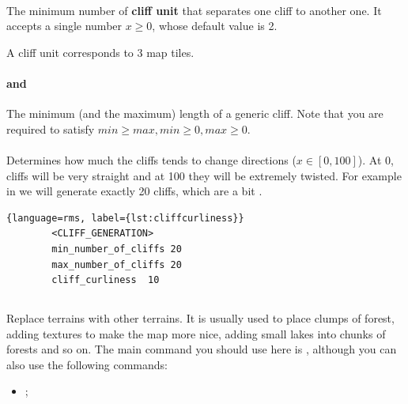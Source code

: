 \begin{appendices}
    \paragraph{}

    The minimum number of \textbf{cliff unit} that separates one cliff to another one. It accepts a single number $x \geq 0$, whose default value is 2.

    \begin{definition}
        A cliff unit corresponds to 3 map tiles.
    \end{definition}

    \paragraph{ and }

    The minimum (and the maximum) length of a generic cliff. Note that you are required to satisfy $min \geq max, min \geq 0, max \geq 0$.

    \paragraph{}

    Determines how much the cliffs tends to change directions ($x \in [0, 100]$). At 0, cliffs will be very straight and at 100 they will be extremely twisted. For example in  we will generate exactly 20 cliffs, which are a bit .

    \begin{lstlisting}{language=rms, label={lst:cliffcurliness}}
        <CLIFF_GENERATION>
        min_number_of_cliffs 20
        max_number_of_cliffs 20
        cliff_curliness  10
    \end{lstlisting}

    \subsection{}

    Replace terrains with other terrains. It is usually used to place clumps of forest, adding textures to make the map more nice, adding small lakes into chunks of forests and so on. The main command you should use here is , although you can also use the following commands:

    \begin{itemize}
        \item {};
    \end{itemize}




\end{appendices}
